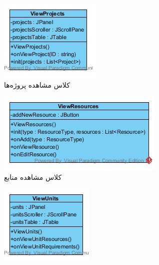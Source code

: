 \begin{figure}[H]
	\centering
	\begin{subfigure}[b]{0.3\textwidth}
		\includegraphics[width=\textwidth]{img/class-design/ui/ViewProjects.jpg}
		\caption{کلاس مشاهده پروژه‌ها}
	\end{subfigure}
	\hfill
	\begin{subfigure}[b]{0.3\textwidth}
		\includegraphics[width=\textwidth]{img/class-design/ui/ViewResources.jpg}
		\caption{کلاس مشاهده منابع}
	\end{subfigure}
	\hfill
	\begin{subfigure}[b]{0.3\textwidth}
		\includegraphics[width=\textwidth]{img/class-design/ui/ViewUnits.png}

\end{subfigure}
\end{figure}
